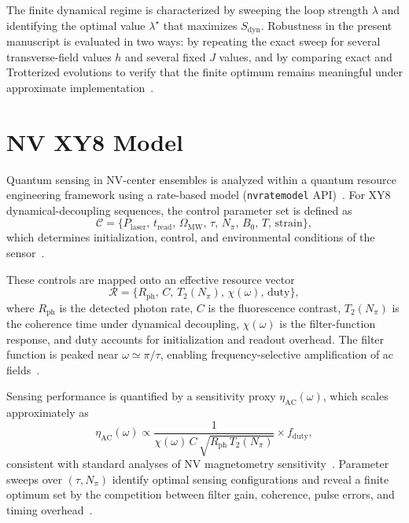 ﻿\documentclass[aps,prx,reprint,superscriptaddress,longbibliography,floatfix]{revtex4-2}
\begin{document}
The finite dynamical regime is characterized by sweeping the loop strength $\lambda$ and identifying the optimal value $\lambda^\star$ that maximizes $S_{\mathrm{dyn}}$. Robustness in the present manuscript is evaluated in two ways: by repeating the exact sweep for several transverse-field values $h$ and several fixed $J$ values, and by comparing exact and Trotterized evolutions to verify that the finite optimum remains meaningful under approximate implementation~\cite{Childs2019}.


\section{NV XY8 Model}

Quantum sensing in NV-center ensembles is analyzed within a quantum resource engineering framework using a rate-based model (\texttt{nvratemodel} API)~\cite{NVRateModel2023,Degen2017,Barry2020}. For XY8 dynamical-decoupling sequences, the control parameter set is defined as
\begin{equation}
\mathcal{C} = \{P_{\mathrm{laser}},\, t_{\mathrm{read}},\, \Omega_{\mathrm{MW}},\, \tau,\, N_{\pi},\, B_0,\, T,\, \mathrm{strain}\},
\end{equation}
which determines initialization, control, and environmental conditions of the sensor~\cite{Casola2018}.

These controls are mapped onto an effective resource vector
\begin{equation}
\mathcal{R} = \{R_{\mathrm{ph}},\, C,\, T_2(N_{\pi}),\, \chi(\omega),\, \mathrm{duty}\},
\end{equation}
where $R_{\mathrm{ph}}$ is the detected photon rate, $C$ is the fluorescence contrast, $T_2(N_{\pi})$ is the coherence time under dynamical decoupling, $\chi(\omega)$ is the filter-function response, and $\mathrm{duty}$ accounts for initialization and readout overhead. The filter function is peaked near $\omega \simeq \pi/\tau$, enabling frequency-selective amplification of ac fields~\cite{Cywinski2008}.

Sensing performance is quantified by a sensitivity proxy $\eta_{\mathrm{AC}}(\omega)$, which scales approximately as
\begin{equation}
\eta_{\mathrm{AC}}(\omega) \propto \frac{1}{\chi(\omega)\,C\,\sqrt{R_{\mathrm{ph}}\,T_2(N_{\pi})}} \times f_{\mathrm{duty}},
\end{equation}
consistent with standard analyses of NV magnetometry sensitivity~\cite{Degen2017,Barry2020}. Parameter sweeps over $(\tau,N_{\pi})$ identify optimal sensing configurations and reveal a finite optimum set by the competition between filter gain, coherence, pulse errors, and timing overhead~\cite{Cywinski2008,Casola2018}.
\end{document}
